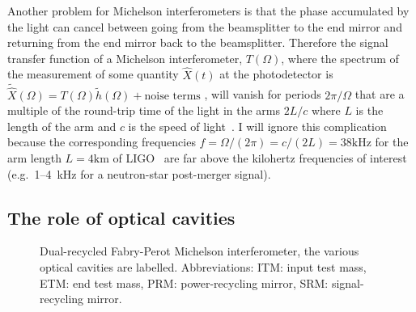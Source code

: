 Another problem for Michelson interferometers is that the phase accumulated by the light can cancel between going from the beamsplitter to the end mirror and returning from the end mirror back to the beamsplitter.
Therefore the signal transfer function of a Michelson interferometer, $T(\Omega)$, where the spectrum of the measurement of some quantity $\hat{X}(t)$ at the photodetector is $\tilde{\hat{X}}(\Omega) = T(\Omega) \tilde{h}(\Omega) + \text{noise terms}$ , will vanish for periods $2\pi/\Omega$ that are a multiple of the round-trip time of the light in the arms $2L/c$ where $L$ is the length of the arm and $c$ is the speed of light~\cite{}. %
I will ignore this complication because the corresponding frequencies $f=\Omega/(2\pi)=c/(2L)=38\mathrm{kHz}$ for the arm length $L=4\mathrm{km}$ of LIGO~\cite{} are far above the kilohertz frequencies of interest (e.g.\ 1--4~kHz for a neutron-star post-merger signal).

\subsection{The role of optical cavities}

\begin{figure}
	\centering
	\caption{Dual-recycled Fabry-Perot Michelson interferometer, the various optical cavities are labelled. Abbreviations: ITM: input test mass, ETM: end test mass, PRM: power-recycling mirror, SRM: signal-recycling mirror.}
	\label{fig:DRFPMI}
\end{figure}

